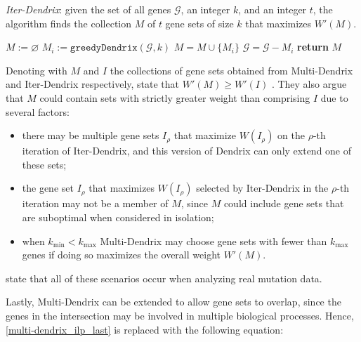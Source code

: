 \begin{algorithm}[H]
    \caption{
        \textit{Iter-Dendrix}: given the set of all genes $\mathcal G$, an integer $k$, and an integer $t$, the algorithm finds the collection $M$ of $t$ gene sets of size $k$ that maximizes $W'(M)$.
    }

        \label{iter-dendrix}
    \begin{algorithmic}[1]
            \State $M := \varnothing$
            \State $M_i := \texttt{greedyDendrix}(\mathcal G, k)$ 
                \State $M = M \cup \{M_i\}$
                \State $\mathcal G = \mathcal G - M_i$
            \EndFor
            \State \textbf{return} $M$
        \EndFunction
    \end{algorithmic}
\end{algorithm}


Denoting with $M$ and $I$ the collections of gene sets obtained from Multi-Dendrix and Iter-Dendrix respectively, \textcite{multi-dendrix} state that $W'(M) \ge W'(I)$ . They also argue that $M$ could contain sets with strictly greater weight than comprising $I$ due to several factors:

\begin{itemize}
    \item there may be multiple gene sets $I_\rho$ that maximize $W(I_\rho)$ on the $\rho$-th iteration of Iter-Dendrix, and this version of Dendrix can only extend one of these sets;
    \item the gene set $I_\rho$ that maximizes $W(I_\rho)$ selected by Iter-Dendrix in the $\rho$-th iteration may not be a member of $M$, since $M$ could include gene sets that are suboptimal when considered in isolation;
    \item when $k_\mathrm{min} < k_\mathrm{max}$ Multi-Dendrix may choose gene sets with fewer than $k_\mathrm{max}$ genes if doing so maximizes the overall weight $W'(M)$.
\end{itemize}

\textcite{multi-dendrix} state that all of these scenarios occur when analyzing real mutation data.

Lastly, Multi-Dendrix can be extended to allow gene sets to overlap, since the genes in the intersection may be involved in multiple biological processes. Hence, \cref{multi-dendrix_ilp_last} is replaced with the following equation:

